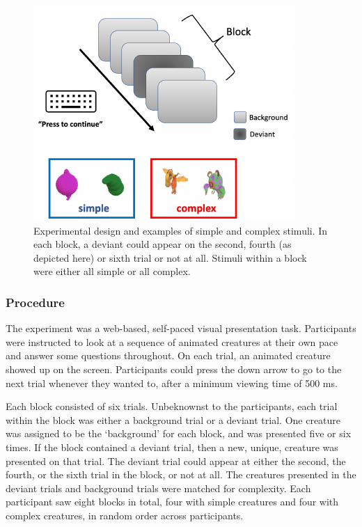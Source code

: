 \documentclass[
  man,floatsintext]{apa6}
\begin{document}
\begin{figure}

{\centering \includegraphics[width=\textwidth]{pokebaby_main_files/figure-latex/unnamed-chunk-7-1} 

}

\caption{Experimental design and examples of simple and complex stimuli. In each block, a deviant could appear on the second, fourth (as depicted here) or sixth trial or not at all. Stimuli within a block were either all simple or all complex.}\label{fig:unnamed-chunk-7}
\end{figure}

\hypertarget{procedure}{%
\subsubsection{Procedure}\label{procedure}}

The experiment was a web-based, self-paced visual presentation task. Participants were instructed to look at a sequence of animated creatures at their own pace and answer some questions throughout. On each trial, an animated creature showed up on the screen. Participants could press the down arrow to go to the next trial whenever they wanted to, after a minimum viewing time of 500 ms.

Each block consisted of six trials. Unbeknownst to the participants, each trial within the block was either a background trial or a deviant trial. One creature was assigned to be the `background' for each block, and was presented five or six times. If the block contained a deviant trial, then a new, unique, creature was presented on that trial. The deviant trial could appear at either the second, the fourth, or the sixth trial in the block, or not at all. The creatures presented in the deviant trials and background trials were matched for complexity. Each participant saw eight blocks in total, four with simple creatures and four with complex creatures, in random order across participants.
\end{document}
